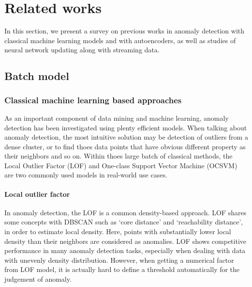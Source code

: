 \chapter{Related works}
\label{chap:related works}

In this section, we present a survey on previous works in anomaly detection with classical machine learning models and with autoencoders, as well as studies of neural network updating along with streaming data.

\section{Batch model}
\label{sec:batch}

\subsection{Classical machine learning based approaches}
\label{sec:classical}

As an important component of data mining and machine learning, anomaly detection has been investigated using plenty efficient models. When talking about anomaly detection, the most intuitive solution may be detection of outliers from a dense cluster, or to find thoes data points that have obvious different property as their neighbors and so on. Within thoes large batch of classical methods, the Local Outlier Factor (LOF) and One-class Support Vector Machine (OCSVM) are two commonly used models in real-world use cases.

\subsubsection{Local outlier factor}
\label{lof}
In anomaly detection, the LOF is a common density-based approach. LOF shares some concepts with DBSCAN such as ‘core distance’ and ‘reachability distance’, in order to estimate local density. Here, points with substantially lower local density than their neighbors are considered as anomalies. LOF shows competitive performance in many anomaly detection tasks, especially when dealing with data with unevenly density distribution. However, when getting a numerical factor from LOF model, it is actually hard to define a threshold automatically for the judgement of anomaly.\\\\

